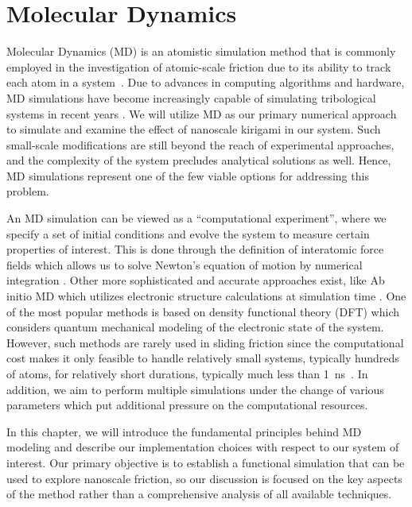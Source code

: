 \chapter{Molecular Dynamics}\label{chap:MD}
Molecular Dynamics (\acrshort{MD}) is an atomistic simulation method that is commonly employed in the investigation of atomic-scale friction due to its ability to track each atom in a system~\cite{Yalin_2011}. Due to advances in computing algorithms and hardware, \acrshort{MD} simulations have become increasingly capable of simulating tribological systems in recent years \cite{Manini_2016}. We will utilize \acrshort{MD} as our primary numerical approach to simulate and examine the effect of nanoscale kirigami in our system. Such small-scale modifications are still beyond the reach of experimental approaches, and the complexity of the system precludes analytical solutions as well. Hence, \acrshort{MD} simulations represent one of the few viable options for addressing this problem.

An \acrshort{MD} simulation can be viewed as a ``computational experiment'', where we specify a set of initial conditions and evolve the system to measure certain properties of interest. This is done through the definition of interatomic force fields which allows us to solve Newton's equation
of motion by numerical integration \cite[p. 303]{BHUSHAN20051507}. Other more sophisticated and accurate approaches exist, like Ab initio \acrshort{MD} which utilizes electronic structure calculations at simulation time \cite{carloni_role_2002}. One of the most popular methods is based on density functional theory (DFT) \cite{PhysRev.136.B864} which considers quantum mechanical modeling of the electronic state of the system. However, such methods are rarely used in sliding friction since the computational cost makes it only feasible to handle relatively small systems, typically hundreds of atoms, for relatively short durations, typically much less than \SI{1}{ns}~\cite{Vanossi_2013}. In addition, we aim to perform multiple simulations under the
change of various parameters which put additional pressure on the
computational resources. 

In this chapter, we will introduce the fundamental principles behind \acrshort{MD} modeling and describe our implementation choices with respect to our system of interest. Our primary objective is to establish a functional simulation that can be used to explore nanoscale friction, so our discussion is focused on the key aspects of the method rather than a comprehensive analysis of all available techniques.





